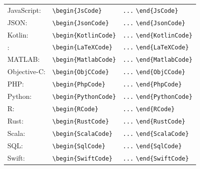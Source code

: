 \begin{table}
\begin{tabular}{@{}lll@{}}
	JavaScript:  & \verb!\begin{JsCode}!
		& \verb!...! \verb!\end{JsCode}! \\
	JSON:        & \verb!\begin{JsonCode}!
		& \verb!...! \verb!\end{JsonCode}! \\
	Kotlin:      & \verb!\begin{KotlinCode}!
		& \verb!...! \verb!\end{KotlinCode}! \\
	\latex:      & \verb!\begin{LaTeXCode}!
		& \verb!...! \verb!\end{LaTeXCode}! \\
	MATLAB:      & \verb!\begin{MatlabCode}!
		& \verb!...! \verb!\end{MatlabCode}! \\
	Objective-C: & \verb!\begin{ObjCCode}!
		& \verb!...! \verb!\end{ObjCCode}! \\
	PHP:         & \verb!\begin{PhpCode}!
		& \verb!...! \verb!\end{PhpCode}! \\
	Python:      & \verb!\begin{PythonCode}!
		& \verb!...! \verb!\end{PythonCode}! \\
	R:           & \verb!\begin{RCode}!
		& \verb!...! \verb!\end{RCode}! \\
	Rust:        & \verb!\begin{RustCode}!
		& \verb!...! \verb!\end{RustCode}! \\
	Scala:       & \verb!\begin{ScalaCode}!
		& \verb!...! \verb!\end{ScalaCode}! \\
	SQL:         & \verb!\begin{SqlCode}!
		& \verb!...! \verb!\end{SqlCode}! \\
	Swift:       & \verb!\begin{SwiftCode}!
		& \verb!...! \verb!\end{SwiftCode}! \\

\end{tabular}
\end{table}
